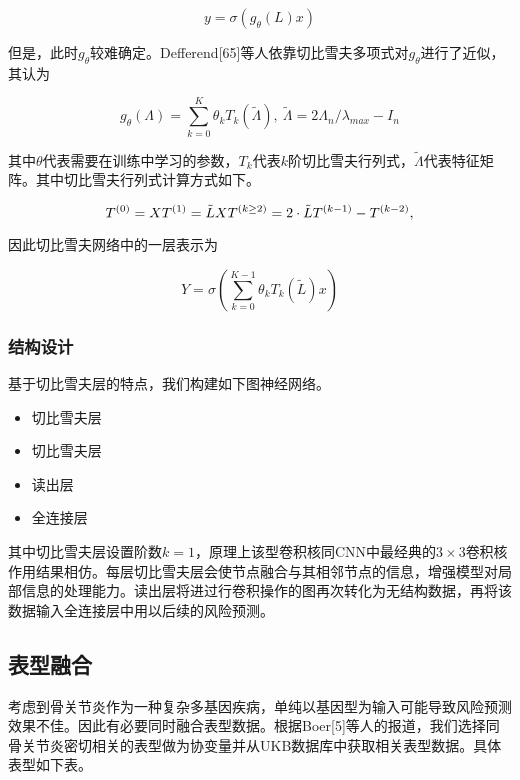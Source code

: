 \documentclass[
]{article}
\begin{document}
\[y=\sigma(g_\theta(L)x)\]

但是，此时\(g_\theta\)较难确定。Defferend{[}65{]}等人依靠切比雪夫多项式对\(g_\theta\)进行了近似，其认为

\[g_{\theta}(\Lambda)=\sum_{k=0}^{K}\theta_kT_k(\tilde{\Lambda}),\ \tilde{\Lambda}=2\Lambda_n/\lambda_{max}-I_n\]

其中\(\theta\)代表需要在训练中学习的参数，\(T_k\)代表\(k\)阶切比雪夫行列式，\(\tilde{\Lambda}\)代表特征矩阵。其中切比雪夫行列式计算方式如下。

\[T^{(0)} = X \\
T^{(1)} = \tilde L X \\
T^{(k \ge 2)} = 2 \cdot \tilde L T^{(k - 1)} - T^{(k - 2)},\]

因此切比雪夫网络中的一层表示为

\[Y=\sigma \left(  \sum_{k=0}^{K-1}{\theta_k T_k (\tilde{L})}   x \right)\]

\hypertarget{ux7ed3ux6784ux8bbeux8ba1}{%
\subsubsection{结构设计}\label{ux7ed3ux6784ux8bbeux8ba1}}

基于切比雪夫层的特点，我们构建如下图神经网络。

\begin{itemize}
\item
  切比雪夫层
\item
  切比雪夫层
\item
  读出层
\item
  全连接层
\end{itemize}

其中切比雪夫层设置阶数\(k=1\)，原理上该型卷积核同CNN中最经典的\(3\times3\)卷积核作用结果相仿。每层切比雪夫层会使节点融合与其相邻节点的信息，增强模型对局部信息的处理能力。读出层将进过行卷积操作的图再次转化为无结构数据，再将该数据输入全连接层中用以后续的风险预测。

\hypertarget{ux8868ux578bux878dux5408-1}{%
\subsection{表型融合}\label{ux8868ux578bux878dux5408-1}}

考虑到骨关节炎作为一种复杂多基因疾病，单纯以基因型为输入可能导致风险预测效果不佳。因此有必要同时融合表型数据。根据Boer{[}5{]}等人的报道，我们选择同骨关节炎密切相关的表型做为协变量并从UKB数据库中获取相关表型数据。具体表型如下表。
\end{document}
